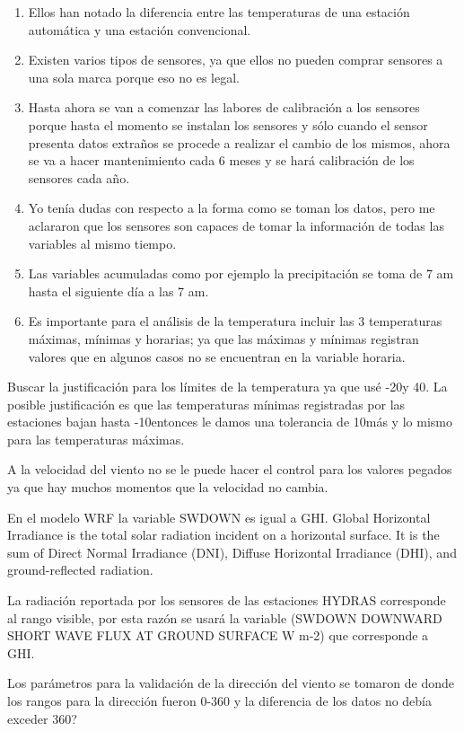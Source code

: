 \begin{enumerate}
\item Ellos han notado la diferencia entre las temperaturas de una estación automática y una estación convencional.
\item Existen varios tipos de sensores, ya que ellos no pueden comprar sensores a una sola marca porque eso no es legal.
\item Hasta ahora se van a comenzar las labores de calibración a los sensores porque hasta el momento se instalan los sensores y sólo cuando el sensor presenta datos extraños se procede a realizar el cambio de los mismos, ahora se va a hacer mantenimiento cada 6 meses y se hará calibración de los sensores cada año.
\item Yo tenía dudas con respecto a la forma como se toman los datos, pero me aclararon que los sensores son capaces de tomar la información de todas las variables al mismo tiempo.
\item Las variables acumuladas como por ejemplo la precipitación se toma de 7 am hasta el siguiente día a las 7 am.
\item Es importante para el análisis de la temperatura incluir las 3 temperaturas máximas, mínimas y horarias; ya que las máximas y mínimas registran valores que en algunos casos no se encuentran en la variable horaria.

\end{enumerate}

Buscar la justificación para los límites de la temperatura ya que usé -20\celc y 40\celc. La posible justificación es que las temperaturas mínimas registradas por las estaciones bajan hasta -10\celc entonces le damos una tolerancia de 10\celc más y lo mismo para las temperaturas máximas.

A la velocidad del viento no se le puede hacer el control para los valores pegados ya que hay muchos momentos que la velocidad no cambia.

En el modelo WRF la variable SWDOWN es igual a GHI. Global Horizontal Irradiance is the total solar radiation incident on a horizontal surface. It is the sum of Direct Normal Irradiance (DNI), Diffuse Horizontal Irradiance (DHI), and ground-reflected radiation.

La radiación reportada por los sensores de las estaciones HYDRAS corresponde al rango visible, por esta razón se usará la variable (SWDOWN DOWNWARD SHORT WAVE FLUX AT GROUND SURFACE W m-2) que corresponde a GHI.

Los parámetros para la validación de la dirección del viento se tomaron de \citep{Shafer2000a, DeGaetano1996} donde los rangos para la dirección fueron 0-360 y la diferencia de los datos no debía exceder 360?

